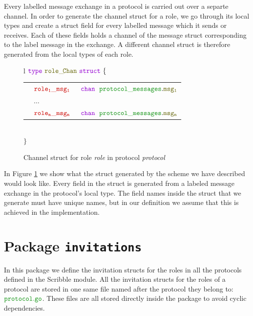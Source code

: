 \documentclass[12pt,twoside]{report}
\begin{document}
Every labelled message exchange in a protocol is carried out over a separte channel. In order to generate the channel struct for a role, we go through its local types and create a struct field for every labelled message which it sends or receives. Each of these fields holds a channel of the message struct corresponding to the label message in the exchange. A different channel struct is therefore generated from the local types of each role.\\

\begin{figure}[!h]
    \begin{center}
        \begin{tabular}{l}
            $\gotype\ \structname{role\_\!Chan}\ \gostruct\ \{$\\[3pt]
            \begin{tabular}{lll}
                \indent & $\structfield{role_1\_msg_1}$\ &$\gochan\ \;\pkgstructaccess{protocol\_messages}{msg_1}$\\
                \indent & $\dots$ & \\
                \indent & $\structfield{role_n\_msg_n}$\ &$\gochan\ \;\pkgstructaccess{protocol\_messages}{msg_n}$
            \end{tabular}\\
            $\}$
        \end{tabular}
    \end{center}
    \caption{Channel struct for role \textit{role} in protocol \textit{protocol}}
    \label{channel-struct-gen}
\end{figure}

In Figure \ref{channel-struct-gen} we show what the struct generated by the scheme we have described would look like. Every field in the struct is generated from a labeled message exchange in the protocol's local type. The field names inside the struct that we generate must have unique names, but in our definition we assume that this is achieved in the implementation.

\section{Package \texttt{invitations}}\label{pkg-invitations}
In this package we define the invitation structs for the roles in all the protocols defined in the Scribble module. All the invitation structs for the roles of a protocol are stored in one same file named after the protocol they belong to: $\filename{protocol}$. These files are all stored directly inside the package to avoid cyclic dependencies.
\end{document}
